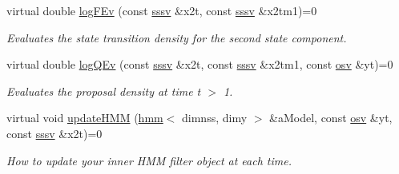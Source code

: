 \begin{DoxyCompactItemize}
virtual double \hyperlink{classrbpf__hmm_a2993f99b3985ebff416bef584bcde06e}{log\+F\+Ev} (const \hyperlink{classrbpf__hmm_aa7d73e78fca38e3652890c5c3680dee9}{sssv} \&x2t, const \hyperlink{classrbpf__hmm_aa7d73e78fca38e3652890c5c3680dee9}{sssv} \&x2tm1)=0
\begin{DoxyCompactList}\small\item\em Evaluates the state transition density for the second state component. \end{DoxyCompactList}\item 
virtual double \hyperlink{classrbpf__hmm_a89ba86cdefbb69e3d3b5b1b17b51394f}{log\+Q\+Ev} (const \hyperlink{classrbpf__hmm_aa7d73e78fca38e3652890c5c3680dee9}{sssv} \&x2t, const \hyperlink{classrbpf__hmm_aa7d73e78fca38e3652890c5c3680dee9}{sssv} \&x2tm1, const \hyperlink{classrbpf__hmm_a6ce5868477ec9ad6eaa3b3b23e99e1ae}{osv} \&yt)=0
\begin{DoxyCompactList}\small\item\em Evaluates the proposal density at time t $>$ 1. \end{DoxyCompactList}\item 
virtual void \hyperlink{classrbpf__hmm_a3eaa1683d31020c62901c68264d0ec1c}{update\+H\+MM} (\hyperlink{classhmm}{hmm}$<$ dimnss, dimy $>$ \&a\+Model, const \hyperlink{classrbpf__hmm_a6ce5868477ec9ad6eaa3b3b23e99e1ae}{osv} \&yt, const \hyperlink{classrbpf__hmm_aa7d73e78fca38e3652890c5c3680dee9}{sssv} \&x2t)=0
\begin{DoxyCompactList}\small\item\em How to update your inner H\+MM filter object at each time. \end{DoxyCompactList}\end{DoxyCompactItemize}
